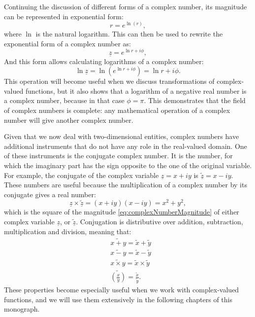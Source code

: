 \documentclass[
]{book}
\begin{document}
Continuing the discussion of different forms of a complex number, its magnitude can be represented in exponential form:
\begin{equation*}
    r = e^{\ln(r)},
\end{equation*}
where \(\ln\) is the natural logarithm. This can then be used to rewrite the exponential form of a complex number as:
\begin{equation}
    \underline{z} = e^{\ln r + i \phi} ,
    \label{eq:complexNumberExponentialAll}
\end{equation}
And this form allows calculating logarithms of a complex number:
\begin{equation}
    \ln \underline{z} = \ln \left(e^{\ln r + i \phi} \right) = \ln r + i \phi .
    \label{eq:complexNumberLogarithm}
\end{equation}
This operation will become useful when we discuss transformations of complex-valued functions, but it also shows that a logarithm of a negative real number is a complex number, because in that case \(\phi=\pi\). This demonstrates that the field of complex numbers is complete: any mathematical operation of a complex number will give another complex number.

Given that we now deal with two-dimensional entities, complex numbers have additional instruments that do not have any role in the real-valued domain. One of these instruments is the conjugate complex number. It is the number, for which the imaginary part has the sign opposite to the one of the original variable. For example, the conjugate of the complex variable \(\underline{z} = x+ iy\) is \(\underline{\tilde{z}} = x- iy\). These numbers are useful because the multiplication of a complex number by its conjugate gives a real number:
\begin{equation}
    \underline{z} \times \underline{\tilde{z}} = (x+ iy) (x- iy) = x^2 + y^2 ,
    \label{eq:complexNumberConjugateMulti}
\end{equation}
which is the square of the magnitude \eqref{eq:complexNumberMagnitude} of either complex variable \(\underline{z}\), or \(\underline{\tilde{z}}\). Conjugation is distributive over addition, subtraction, multiplication and division, meaning that:
\begin{equation}
    \begin{aligned}
        & \widetilde{x + y} = \tilde{x} + \tilde{y} \\
        & \widetilde{x - y} = \tilde{x} - \tilde{y} \\
        & \widetilde{x \times y} = \tilde{x} \times \tilde{y} \\
        & \widetilde{\left(\frac{x}{y}\right)} = \frac{\tilde{x}}{\tilde{y}} .
    \end{aligned}
    \label{eq:complexNumberConjugateDistributive}
\end{equation}
These properties become especially useful when we work with complex-valued functions, and we will use them extensively in the following chapters of this monograph.
\end{document}
